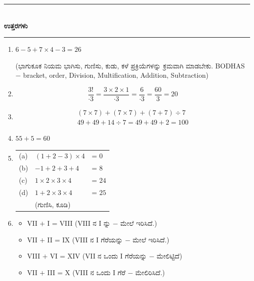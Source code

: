 \smallskip

\begin{center}
\rule{5cm}{1pt}\\[3pt]
{\Large\bfseries ಉತ್ತರಗಳು}\\[-0.1cm]
\rule{5cm}{1pt}
\end{center}

\begin{enumerate}
\item $6 - 5 + 7 \times 4 - 3 = 26$

(ಭಾಗುಕೂಕ ನಿಯಮ ಭಾಗಿಸು, ಗುಣಿಸು, ಕುಡು, ಕಳೆ ಪ್ರಕ್ರಿಯೆಗಳನ್ನು ಕ್ರಮವಾಗಿ ಮಾಡಬೇಕು. BODHAS $-$ bracket, order, Division, Multification, Addition, Subtraction)

\item 
\begin{equation*}
\dfrac{3!}{\cdot 3} = \dfrac{3\times 2\times 1}{\cdot 3} = \dfrac{6}{\cdot 3} = \dfrac{60}{3} = 20
\end{equation*}

\item 
\begin{gather*}
(7\times 7) + (7\times 7) + {(7 + 7) \div 7}\\
49 + 49 + 14 \div 7 = 49 + 49 + 2 = 100
\end{gather*}

\item  $55 + 5 = 60$

\item 
\begin{tabular}[t]{lll}
(a) & $(1 + 2 - 3)\times 4$ &  = $0$\\
(b) & $-1 + 2 + 3 + 4$ & = $8$\\
(c) & $1\times 2\times 3\times 4$ &  = $24$\\
(d) & $1 + 2\times 3\times 4$ &  = $25$\\
& (ಗುಣಿಸಿ, ಕೂಡಿ) & 
\end{tabular}

\item 
\begin{itemize}
\item[(a)] VII $+$ I = VIII (VIII ನ I ನ್ನು $-$ ಮೇಲೆ ಇರಿಸಿದೆ.)
\item[(b)] VII $+$ II = IX (VIII ನ I ಗೆರೆಯನ್ನು $-$ ಮೇಲೆ ಇರಿಸಿದೆ.)
\item[(c)] VIII $+$ VI = XIV (VII ನ ಒಂದು I ಗೆರೆಯನ್ನು $-$ ಮೇಲಿಟ್ಟಿದೆ)
\item[(d)] VII $+$ III = X (VIII ನ ಒಂದು I ಗೆರೆ $-$ ಮೇಲಿರಿಸಿದೆ.)
\end{itemize}


\end{enumerate}
